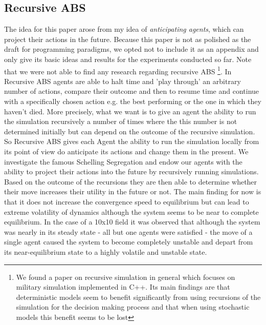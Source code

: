 \subsection{Recursive ABS}
The idea for this paper arose from my idea of \textit{anticipating agents}, which can project their actions in the future. Because this paper is not as polished as the draft for programming paradigms, we opted not to include it as an appendix and only give its basic ideas and results for the experiments conducted so far. Note that we were not able to find any research regarding recursive ABS \footnote{We found a paper on recursive simulation in general \cite{gilmer_recursive_2000} which focuses on military simulation implemented in C++. Its main findings are that deterministic models seem to benefit significantly from using recursions of the simulation for the decision making process and that when using stochastic models this benefit seems to be lost}.
In Recursive ABS agents are able to halt time and 'play through' an arbitrary number of actions, compare their outcome and then to resume time and continue with a specifically chosen action e.g. the best performing or the one in which they haven't died. More precisely, what we want is to give an agent the ability to run the simulation recursively a number of times where the this number is not determined initially but can depend on the outcome of the recursive simulation. So Recursive ABS gives each Agent the ability to run the simulation locally from its point of view do anticipate its actions and change them in the present.
We investigate the famous Schelling Segregation \cite{schelling_dynamic_1971} and endow our agents with the ability to project their actions into the future by recursively running simulations. Based on the outcome of the recursions they are then able to determine whether their move increases their utility in the future or not. The main finding for now is that it does not increase the convergence speed to equilibrium but can lead to extreme volatility of dynamics although the system seems to be near to complete equilibrium. In the case of a 10x10 field it was observed that although the system was nearly in its steady state - all but one agents were satisfied - the move of a single agent caused the system to become completely unstable and depart from its near-equilibrium state to a highly volatile and unstable state.

